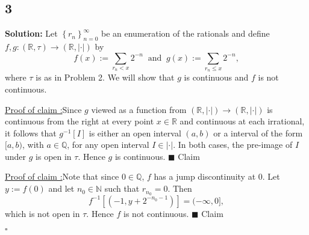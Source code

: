 \documentclass[12pt]{article}
\newcounter{ProofCounter}
\newcounter{ClaimCounter}[ProofCounter]
\newenvironment{Solution}{\stepcounter{ProofCounter}\textbf{Solution:}}{\hfill$\square$}
\newenvironment{claim}[1]{\vspace{1mm}\stepcounter{ClaimCounter}\par\noindent\underline{\bf Claim \theClaimCounter:}\space#1}{}
\newenvironment{claimproof}[1]{\par\noindent\underline{Proof of claim \theClaimCounter:}\space#1}{\hfill $\blacksquare$ Claim \theClaimCounter}
\begin{document}
\subsection*{3}
\begin{Solution}
  Let $\left\{ r_n \right\}_{n=0}^{\infty}$ be an enumeration of the rationals and define $f, g: (\mathbb{R}, \tau) \rightarrow (\mathbb{R}, |\cdot|)$
  by
  \[
    f(x) := \sum_{r_n < x}2^{-n} \ \text{ and } \ g(x) := \sum_{r_n \leq x}2^{-n},
  \]
  where $\tau$ is as in Problem 2. We will show that $g$ is continuous and $f$ is not continuous. 

  \begin{claimproof}
    Since $g$ viewed as a function from $(\mathbb{R}, |\cdot|) \rightarrow (\mathbb{R}, |\cdot|)$ is continuous from the right at every point $x \in
    \mathbb{R}$ and continuous at each irrational, it follows that $g^{-1}[I]$ is either an open interval $(a,b)$ or a interval of the form $[a,b)$,
    with $a \in \mathbb{Q}$, for any open interval $I \in |\cdot|$. In both cases, the pre-image of $I$ under $g$ is open in $\tau$.
    Hence $g$ is continuous.
  \end{claimproof}

  \begin{claimproof}
    Note that since $0 \in \mathbb{Q}$, $f$ has a jump discontinuity at $0$. Let $y := f(0)$ and let $n_0 \in \mathbb{N}$ such that $r_{n_0} = 0$.
    Then 
    \[
      f^{-1}[(-1, y + 2^{-n_0-1})] = (-\infty, 0],
    \]
    which is not open in $\tau$. Hence $f$ is not continuous.
  \end{claimproof}

\end{Solution}
\end{document}
